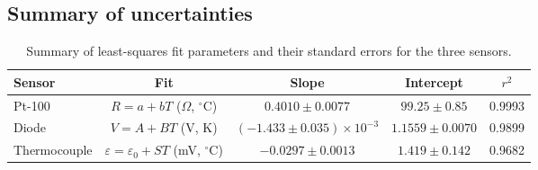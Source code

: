 \documentclass[11pt,a4paper]{article}
\begin{document}
\subsection{Summary of uncertainties}
\begin{table}[H]
\centering
\caption{Summary of least-squares fit parameters and their standard errors for the three sensors.}
\begin{tabular}{lcccc}
\toprule
Sensor & Fit & Slope & Intercept & $r^2$ \\
\midrule
Pt-100 & $R=a+bT$ ($\Omega$, $^\circ$C) & $0.4010\pm0.0077$ & $99.25\pm0.85$ & 0.9993 \\
Diode  & $V=A+BT$ (V, K)  & $(-1.433\pm0.035)\times10^{-3}$ & $1.1559\pm0.0070$ & 0.9899 \\
Thermocouple & $\varepsilon=\varepsilon_0+ST$ (mV, $^\circ$C) & $-0.0297\pm0.0013$ & $1.419\pm0.142$ & 0.9682 \\
\bottomrule
\end{tabular}
\end{table}
\end{document}
